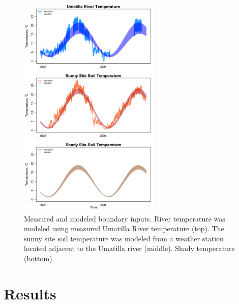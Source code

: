 \documentclass[letterpaper, 11pt]{article}
\begin{document}
\begin{figure}
    \centering
    \includegraphics[width = 0.6\textwidth]{Figures/BoundaryInputs.png}
    \caption{Measured and modeled boundary inputs. River temperature was modeled using measured Umatilla River temperature (top). The sunny site soil temperature was modeled from a weather station located adjacent to the Umatilla river (middle). Shady temperature (bottom).}
    \label{fig:IskulpaaInputTemps}
\end{figure}



    



\section{Results}
\end{document}
